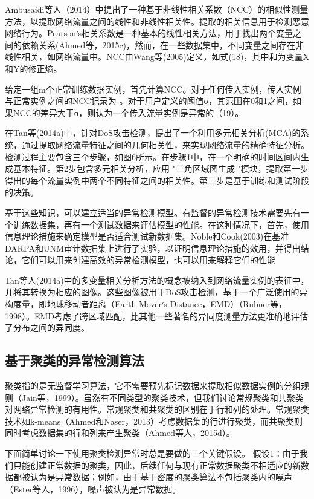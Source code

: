 Ambusaidi等人（2014）中提出了一种基于非线性相关系数（NCC）的相似性测量方法，以提取网络流量之间的线性和非线性相关性。提取的相关信息用于检测恶意网络行为。Pearson׳s相关系数是一种基本的线性相关方法，用于找出两个变量之间的依赖关系(Ahmed等，2015c)，然而，在一些数据集中，不同变量之间存在非线性相关，如网络流量中。NCC由Wang等(2005)定义，如式(18)，其中和为变量X和Y的修正熵。

给定一组m个正常训练数据实例，首先计算NCC。对于任何传入实例，传入实例与正常实例之间的NCC记录为 。对于用户定义的阈值σ，其范围在0和1之间，如果NCC的差异大于σ，则认为一个传入流量实例是异常的（19）。


在Tan等(2014a)中，针对DoS攻击检测，提出了一个利用多元相关分析(MCA)的系统，通过提取网络流量特征之间的几何相关性，来实现网络流量的精确特征分析。检测过程主要包含三个步骤，如图6所示。在步骤1中，在一个明确的时间区间内生成基本特征。第2步包含多元相关分析，应用 "三角区域图生成 "模块，提取第一步得出的每个流量实例中两个不同特征之间的相关性。第三步是基于训练和测试阶段的决策。


基于这些知识，可以建立适当的异常检测模型。有监督的异常检测技术需要先有一个训练数据集，再有一个测试数据来评估模型的性能。在这种情况下，首先，使用信息理论措施来确定模型是否适合测试新数据集。Noble和Cook(2003)在基准DARPA和UNM审计数据集上进行了实验，以证明信息理论措施的效用，并得出结论，它们可以用来创建高效的异常检测模型，也可以用来解释它们的性能

Tan等人(2014a)中的多变量相关分析方法的概念被纳入到网络流量实例的表征中，并将其转换为相应的图像。这些图像被用于DoS攻击检测，基于一个广泛使用的异构度量，即地球移动者距离（Earth Mover׳s Distance，EMD）（Rubner等，1998）。EMD考虑了跨区域匹配，比其他一些著名的异同度测量方法更准确地评估了分布之间的异同度。

\subsection{基于聚类的异常检测算法}

聚类指的是无监督学习算法，它不需要预先标记数据来提取相似数据实例的分组规则（Jain等，1999）。虽然有不同类型的聚类技术，但我们讨论常规聚类和共聚类对网络异常检测的有用性。常规聚类和共聚类的区别在于行和列的处理。常规聚类技术如k-means（Ahmed和Naser，2013）考虑数据集的行进行聚类，而共聚类则同时考虑数据集的行和列来产生聚类（Ahmed等人，2015d）。

下面简单讨论一下使用聚类检测异常时总是要做的三个关键假设。
假设1：由于我们只能创建正常数据的聚类，因此，后续任何与现有正常数据聚类不相适应的新数据都被认为是异常数据；例如，由于基于密度的聚类算法不包括聚类内的噪声（Ester等人，1996），噪声被认为是异常数据。

